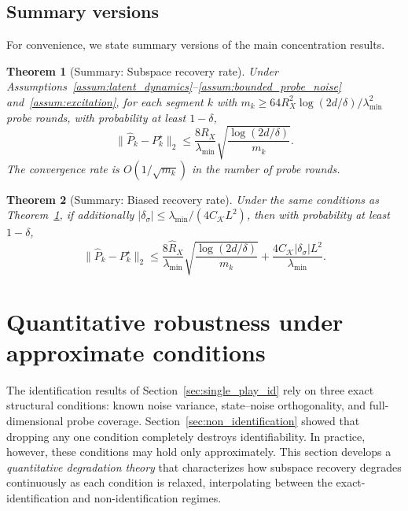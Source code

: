 \documentclass[12pt]{article}
\newtheorem{theorem}{Theorem}
\theoremstyle{plain}
\theoremstyle{definition}
\begin{document}
\subsection{Summary versions}

For convenience, we state summary versions of the main concentration results.

\begin{theorem}[Summary: Subspace recovery rate]
\label{thm:subspace_summary}
Under Assumptions~\ref{assum:latent_dynamics}--\ref{assum:bounded_probe_noise} and~\ref{assum:excitation}, for each segment $k$ with $m_k \ge 64R_X^2 \log(2d/\delta) / \lambda_{\min}^2$ probe rounds, with probability at least $1-\delta$,
\[
\|\widehat{P}_k - P_k^\star\|_2 \le \frac{8R_X}{\lambda_{\min}} \sqrt{\frac{\log(2d/\delta)}{m_k}}.
\]
The convergence rate is $O(1/\sqrt{m_k})$ in the number of probe rounds.
\end{theorem}

\begin{theorem}[Summary: Biased recovery rate]
\label{thm:biased_summary}
Under the same conditions as Theorem~\ref{thm:subspace_summary}, if additionally $|\delta_\sigma| \le \lambda_{\min}/(4C_{\mathcal{K}} L^2)$, then with probability at least $1-\delta$,
\[
\|\widehat{P}_k - P_k^\star\|_2 \le \frac{8\hat{R}_X}{\lambda_{\min}} \sqrt{\frac{\log(2d/\delta)}{m_k}} + \frac{4C_{\mathcal{K}} |\delta_\sigma| L^2}{\lambda_{\min}}.
\]
\end{theorem}


\section{Quantitative robustness under approximate conditions}
\label{sec:robustness}

The identification results of Section~\ref{sec:single_play_id} rely on three exact structural conditions: known noise variance, state--noise orthogonality, and full-dimensional probe coverage. Section~\ref{sec:non_identification} showed that dropping any one condition completely destroys identifiability. In practice, however, these conditions may hold only approximately. This section develops a \emph{quantitative degradation theory} that characterizes how subspace recovery degrades continuously as each condition is relaxed, interpolating between the exact-identification and non-identification regimes.
\end{document}
